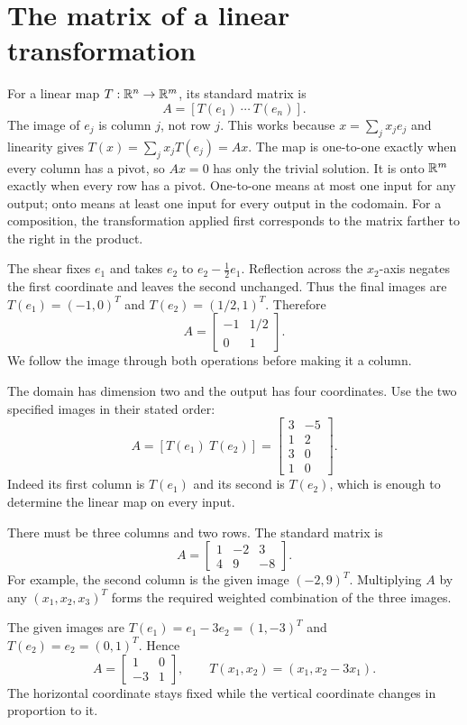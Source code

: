 \section{The matrix of a linear transformation}
For a linear map $T:\mathbb{R}^n\to\mathbb{R}^m$, its standard matrix is
\[
 A=[T(e_1)\ \cdots\ T(e_n)].
\]
The image of $e_j$ is column $j$, not row $j$. This works because
$x=\sum_jx_je_j$ and linearity gives $T(x)=\sum_jx_jT(e_j)=Ax$.
The map is one-to-one exactly when every column has a pivot, so
$Ax=0$ has only the trivial solution. It is onto $\mathbb{R}^m$ exactly when
every row has a pivot. One-to-one means at most one input for any
output; onto means at least one input for every output in the codomain.
For a composition, the transformation applied first corresponds to
the matrix farther to the right in the product.

The shear fixes $e_1$ and takes $e_2$ to $e_2-\tfrac12e_1$.
Reflection across the $x_2$-axis negates the first coordinate and leaves
the second unchanged. Thus the final images are
$T(e_1)=(-1,0)^T$ and $T(e_2)=(1/2,1)^T$. Therefore
\[
 A=\begin{bmatrix}-1&1/2\\0&1\end{bmatrix}.
\]
We follow the image through both operations before making it a column.

The domain has dimension two and the output has four coordinates.
Use the two specified images in their stated order:
\[
 A=[T(e_1)\ T(e_2)]=
 \begin{bmatrix}3&-5\\1&2\\3&0\\1&0\end{bmatrix}.
\]
Indeed its first column is $T(e_1)$ and its second is $T(e_2)$,
which is enough to determine the linear map on every input.

There must be three columns and two rows. The standard matrix is
\[
 A=\begin{bmatrix}1&-2&3\\4&9&-8\end{bmatrix}.
\]
For example, the second column is the given image $(-2,9)^T$.
Multiplying $A$ by any $(x_1,x_2,x_3)^T$ forms the required weighted
combination of the three images.

The given images are $T(e_1)=e_1-3e_2=(1,-3)^T$ and
$T(e_2)=e_2=(0,1)^T$. Hence
\[
 A=\begin{bmatrix}1&0\\-3&1\end{bmatrix},\qquad
 T(x_1,x_2)=(x_1,x_2-3x_1).
\]
The horizontal coordinate stays fixed while the vertical coordinate
changes in proportion to it.

